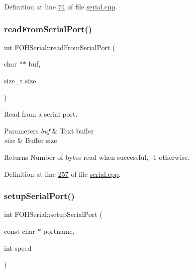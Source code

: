 Definition at line \mbox{\hyperlink{serial_8cpp_source_l00074}{74}} of file \mbox{\hyperlink{serial_8cpp_source}{serial.\+cpp}}.

\mbox{\label{classFOHSerial_a569186c2a1975065f16c473f79f804c4}} 
\subsubsection{\texorpdfstring{read\+From\+Serial\+Port()}{readFromSerialPort()}}
{\footnotesize\ttfamily int F\+O\+H\+Serial\+::read\+From\+Serial\+Port (\begin{DoxyParamCaption}\item[{char $\ast$$\ast$}]{buf,  }\item[{size\+\_\+t}]{size }\end{DoxyParamCaption})}



Read from a serial port. 


\begin{DoxyParams}{Parameters}
{\em buf} & Text buffer \\
\hline
{\em size} & Buffer size\\
\hline
\end{DoxyParams}
\begin{DoxyReturn}{Returns}
Number of bytes read when successful, -\/1 otherwise. 
\end{DoxyReturn}


Definition at line \mbox{\hyperlink{serial_8cpp_source_l00257}{257}} of file \mbox{\hyperlink{serial_8cpp_source}{serial.\+cpp}}.

\mbox{\label{classFOHSerial_ad76591cc93c0abea4acdbc3ebb47435b}} 
\subsubsection{\texorpdfstring{setup\+Serial\+Port()}{setupSerialPort()}}
{\footnotesize\ttfamily int F\+O\+H\+Serial\+::setup\+Serial\+Port (\begin{DoxyParamCaption}\item[{const char $\ast$}]{portname,  }\item[{int}]{speed }\end{DoxyParamCaption})}



